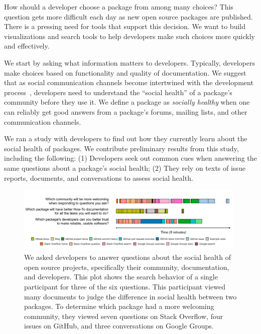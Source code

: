How should a developer choose a package from among many choices?
This question gets more difficult each day as new open source packages are published.
There is a pressing need for tools that support this decision.
We want to build visualizations and search tools to help developers make such choices more quickly and effectively.

We start by asking what information matters to developers.
Typically, developers make choices based on functionality and quality of documentation.
We suggest that as social communication channels become intertwined with the development process~\cite{storey_revolution_2014},
developers need to understand the ``social health'' of a package's community before they use it.
We define a package as \textit{socially healthy} when one can reliably get good answers from a package's forums, mailing lists, and other communication channels.

We ran a study with developers to find out how they currently learn about the social health of packages.
We contribute preliminary results from this study, including the following:
(1) Developers seek out common cues when answering the same questions about a package's social health;
(2) They rely on texts of issue reports, documents, and conversations to assess social health.

\begin{figure}
\centering
\includegraphics[width=0.98\textwidth]{figures/visits}
\caption{%
We asked developers to answer questions about the social health of open source projects,
specifically their community, documentation, and developers.
This plot shows the search behavior of a single participant for three of the six questions.
This participant viewed many documents to judge the difference in social health between two packages.
To determine which package had a more welcoming community, they viewed seven questions on Stack Overflow, four issues on GitHub, and three conversations on Google Groups.
}
\label{fig:visits}
\end{figure}
